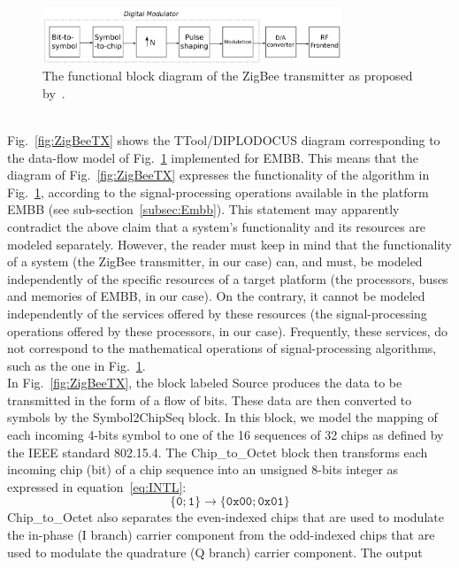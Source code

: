 \documentclass{llncs}
\begin{document}
%
\begin{figure}[!htbp]
	\centering
	\includegraphics[width=0.8\textwidth]{figures/TXBlockDiagram.pdf}
  	\caption{The functional block diagram of the ZigBee transmitter as proposed by~\cite{Koteng06}.}
	\label{fig:TXBlockDiag}
\end{figure}
%
\\Fig.~\ref{fig:ZigBeeTX} shows the TTool/DIPLODOCUS diagram corresponding to the data-flow model of
Fig.~\ref{fig:TXBlockDiag} implemented for EMBB. This means that the diagram of Fig.~\ref{fig:ZigBeeTX} expresses the
functionality of the algorithm in Fig.~\ref{fig:TXBlockDiag}, according to the signal-processing operations available in
the platform EMBB (see sub-section~\ref{subsec:Embb}). This statement may apparently contradict the above claim that
a system's functionality and its resources are modeled separately. However, the reader must keep in mind that the
functionality of a system (the ZigBee transmitter, in our case) can, and must, be modeled independently of the specific
resources of a target platform (the processors, buses and memories of EMBB, in our case). On the contrary, it cannot be
modeled independently of the services offered by these resources (the signal-processing operations offered by these
processors, in our case). Frequently, these services, do not correspond to the mathematical operations of
signal-processing algorithms, such as the one in Fig.~\ref{fig:TXBlockDiag}.\\
%
In Fig.~\ref{fig:ZigBeeTX}, the block labeled Source produces the data to be transmitted in the form of a flow of bits.
These data are then converted to symbols by the Symbol2ChipSeq block. In this block, we model the mapping of each
incoming 4-bits symbol to one of the 16 sequences of 32 chips as defined by the IEEE standard 802.15.4. The
Chip\_to\_Octet block then transforms each incoming chip (bit) of a chip sequence into an unsigned 8-bits integer as
expressed in equation~\ref{eq:INTL}:
%
\begin{equation}
\label{eq:INTL}
\{\texttt{0}; \texttt{1}\} \rightarrow \{\texttt{0x00}; \texttt{0x01}\}
\end{equation}
%
Chip\_to\_Octet also separates the even-indexed chips that are used to modulate the in-phase (I branch) carrier
component from the odd-indexed chips that are used to modulate the quadrature (Q branch) carrier component. The output
\end{document}
